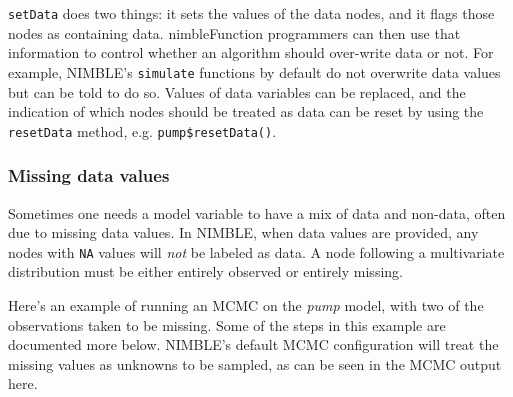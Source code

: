 \documentclass[12pt,oneside]{book}\usepackage[]{graphicx}\usepackage[]{color}
\def\cd#1{\texttt{#1}}
\def\nm#1{\textit{#1}}
\begin{document}
\cd{setData} does two things: it sets the values of the data nodes,
and it flags those nodes as containing data.  nimbleFunction
programmers can then use that information to control whether an
algorithm should over-write data or not.  For example, NIMBLE's
\cd{simulate} functions by default do not overwrite data values but
can be told to do so.  Values of data variables can be replaced, and
the indication of which nodes should be treated as data can be reset
by using the \cd{resetData} method, e.g. \cd{pump\$resetData()}.

\subsubsection{Missing data values}

Sometimes one needs a model variable to have a mix of data and
non-data, often due to missing data values.  In NIMBLE, when data
values are provided, any nodes with \cd{NA} values will \nm{not} be
labeled as data.  A node following a multivariate distribution must be either entirely observed or entirely missing.

Here's an example of running an MCMC on the \nm{pump} model, with two
of the observations taken to be missing.  Some of the steps in this
example are documented more below.  NIMBLE's default MCMC
configuration will treat the missing values as unknowns to be sampled,
as can be seen in the MCMC output here.
\end{document}
